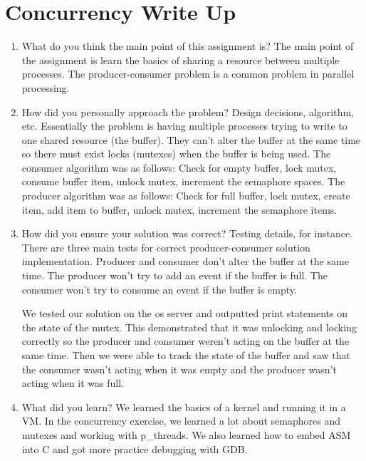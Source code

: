\documentclass[letterpaper,10pt,draftclsnofoot,onecolumn,titlepage]{IEEEtran}
\begin{document}
\section{Concurrency Write Up}
\begin{enumerate}  
		\item What do you think the main point of this assignment is?
		   The main point of the assignment is learn the basics of sharing a resource between multiple processes. The producer-consumer problem is a common problem in parallel processing.
		\item How did you personally approach the problem? Design decisions, algorithm, etc.
		   Essentially the problem is having multiple processes trying to write to one shared resource (the buffer). They can't alter the buffer at the same time so there must exist locks (mutexes) when the buffer is being used.
		   The consumer algorithm was as follows: Check for empty buffer, lock mutex, consume buffer item, unlock mutex, increment the semaphore spaces.
		   The producer algorithm was as follows: Check for full buffer, lock mutex, create item, add item to buffer, unlock mutex, increment the semaphore items. 
		\item How did you ensure your solution was correct? Testing details, for instance.
		   There are three main tests for correct producer-consumer solution implementation.
		   Producer and consumer don't alter the buffer at the same time.
		   The producer won't try to add an event if the buffer is full.
		   The consumer won't try to consume an event if the buffer is empty.

		   We tested our solution on the os server and outputted print statements on the state of the mutex. This demonstrated that it was unlocking and locking correctly so the producer and consumer weren't acting on the buffer at the same time. Then we were able to track the state of the buffer and saw that the consumer wasn't acting when it was empty and the producer wasn't acting when it was full.
		\item What did you learn?
		   We learned the basics of a kernel and running it in a VM. In the concurrency exercise, we learned a lot about semaphores and mutexes and working with p\_threads. We also learned how to embed ASM into C and got more practice debugging with GDB.
 	\end{enumerate}
    
\end{document}
